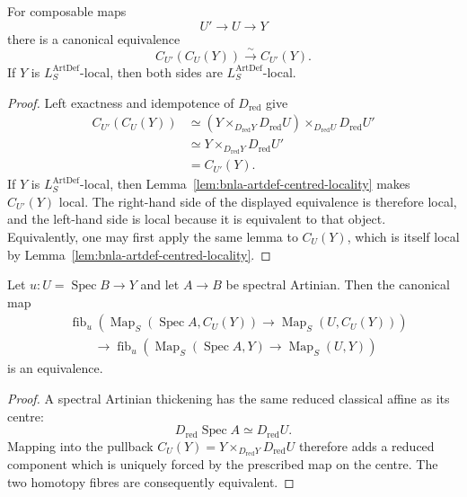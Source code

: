 \begin{lemma}
\label{lem:bnla-artdef-centred-transitivity}
For composable maps
\[
    U'\longrightarrow U\longrightarrow Y
\]
there is a canonical equivalence
\[
\boxed{
    C_{U'}(C_U(Y))
    \xrightarrow{\sim}
    C_{U'}(Y).}
\]
If $Y$ is $L^{\mathrm{ArtDef}}_S$-local, then both sides are
$L^{\mathrm{ArtDef}}_S$-local.
\end{lemma}

\begin{proof}
Left exactness and idempotence of $D_{\mathrm{red}}$ give
\[
\begin{aligned}
C_{U'}(C_U(Y))
&\simeq
\left(
Y\times_{D_{\mathrm{red}}Y}D_{\mathrm{red}}U
\right)
\times_{D_{\mathrm{red}}U}
D_{\mathrm{red}}U'
\\
&\simeq
Y\times_{D_{\mathrm{red}}Y}D_{\mathrm{red}}U'
\\
&=
C_{U'}(Y).
\end{aligned}
\]
If $Y$ is $L^{\mathrm{ArtDef}}_S$-local, then
Lemma~\ref{lem:bnla-artdef-centred-locality} makes $C_{U'}(Y)$ local.  The
right-hand side of the displayed equivalence is therefore local, and the
left-hand side is local because it is equivalent to that object.  Equivalently,
one may first apply the same lemma to $C_U(Y)$, which is itself local by
Lemma~\ref{lem:bnla-artdef-centred-locality}.
\end{proof}

\begin{lemma}
\label{lem:bnla-centred-completion-leaf-invariance}
Let $u:U=\operatorname{Spec}B\to Y$ and let $A\to B$ be spectral Artinian.
Then the canonical map
\[
\begin{aligned}
&\operatorname{fib}_{u}
\left(
    \operatorname{Map}_S(\operatorname{Spec}A,C_U(Y))
    \to
    \operatorname{Map}_S(U,C_U(Y))
\right)
\\
&\qquad\longrightarrow
\operatorname{fib}_{u}
\left(
    \operatorname{Map}_S(\operatorname{Spec}A,Y)
    \to
    \operatorname{Map}_S(U,Y)
\right)
\end{aligned}
\]
is an equivalence.
\end{lemma}

\begin{proof}
A spectral Artinian thickening has the same reduced classical affine as its
centre:
\[
    D_{\mathrm{red}}\operatorname{Spec}A
    \simeq
    D_{\mathrm{red}}U.
\]
Mapping into the pullback
$C_U(Y)=Y\times_{D_{\mathrm{red}}Y}D_{\mathrm{red}}U$
therefore adds a reduced component which is uniquely forced by the prescribed
map on the centre.  The two homotopy fibres are consequently equivalent.
\end{proof}

